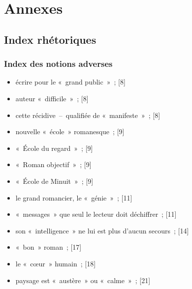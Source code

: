 \documentclass[12pt, a4paper]{article}
\begin{document}
\section{Annexes}

\subsection{Index rhétoriques}
\label{gloss}
\subsubsection{Index des notions adverses}

\begin{itemize}

    \item écrire pour le «~grand public~»{\color{gray}~; [8]}

    \item auteur «~difficile~»{\color{gray}~; [8]}

    \item cette récidive~–~qualifiée de «~manifeste~»{\color{gray}~; [8]}

    \item nouvelle «~école~» romanesque{\color{gray}~; [9]}

    \item «~École du regard~»{\color{gray}~; [9]}

    \item «~Roman objectif~»{\color{gray}~; [9]}

    \item «~École de Minuit~»{\color{gray}~; [9]}

    \item le grand romancier, le «~génie~»{\color{gray}~; [11]}

    \item «~messages~» que seul le lecteur doit déchiffrer{\color{gray}~; [11]}

    \item son «~intelligence~» ne lui est plus d’aucun secours{\color{gray}~; [14]}

    \item «~bon~» roman{\color{gray}~; [17]}

    \item le «~cœur~» humain{\color{gray}~; [18]}

    \item paysage est «~austère~» ou «~calme~»{\color{gray}~; [21]}


\end{itemize}
\end{document}
